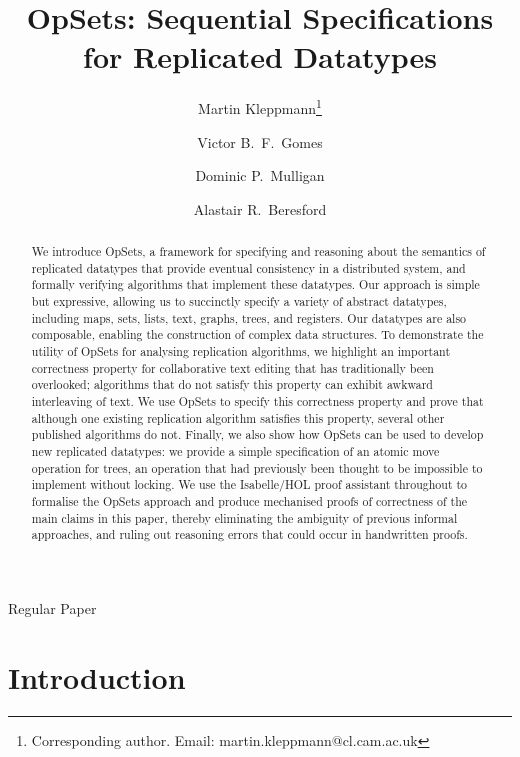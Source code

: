 \documentclass[11pt]{article}
\begin{document}
\sloppy
\title{OpSets: Sequential Specifications for Replicated Datatypes}
\author[1]{Martin Kleppmann\thanks{Corresponding author. Email: martin.kleppmann@cl.cam.ac.uk}}
\author[1]{Victor B.\ F.\ Gomes}
\author[2]{Dominic P.\ Mulligan}
\author[1]{Alastair R.\ Beresford}
\date{}


\maketitle

\begin{center}
Regular Paper
\end{center}

\begin{abstract}
We introduce OpSets, a framework for specifying and reasoning about the semantics of replicated datatypes that provide eventual consistency in a distributed system, and formally verifying algorithms that implement these datatypes.
Our approach is simple but expressive, allowing us to succinctly specify a variety of abstract datatypes, including maps, sets, lists, text, graphs, trees, and registers.
Our datatypes are also composable, enabling the construction of complex data structures.
To demonstrate the utility of OpSets for analysing replication algorithms, we highlight an important correctness property for collaborative text editing that has traditionally been overlooked; algorithms that do not satisfy this property can exhibit awkward interleaving of text.
We use OpSets to specify this correctness property and prove that although one existing replication algorithm satisfies this property, several other published algorithms do not.
Finally, we also show how OpSets can be used to develop new replicated datatypes: we provide a simple specification of an atomic move operation for trees, an operation that had previously been thought to be impossible to implement without locking.
We use the Isabelle/HOL proof assistant throughout to formalise the OpSets approach and produce mechanised proofs of correctness of the main claims in this paper, thereby eliminating the ambiguity of previous informal approaches, and ruling out reasoning errors that could occur in handwritten proofs.
\end{abstract}
\clearpage

\section{Introduction}
\end{document}

